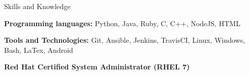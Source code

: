 \documentclass{resume} %
\begin{document}
\begin{rSection}{Skills and Knowledge}
\vspace{-4pt}
\begin{sSubsection}
    {\textbf{Programming languages:} Python, Java, Ruby, C, C++, NodeJS, HTML}{}
\end{sSubsection}
\vspace{-7pt}

\begin{sSubsection}
    {\textbf{Tools and Technologies:} Git, Ansible, Jenkins, TravisCI, Linux, Windows, Bash, LaTex, Android}{}
\end{sSubsection}
\vspace{-7pt}

\begin{sSubsection}
    {\textbf{Red Hat Certified System Administrator (RHEL 7)}}{}
\end{sSubsection}
\vspace{-7pt}

\end{rSection}
\end{document}
